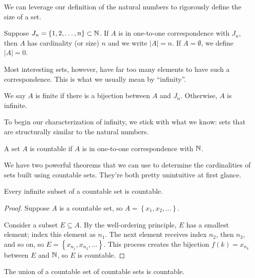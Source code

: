 \documentclass[../m131main.tex]{subfiles}
\begin{document}
We can leverage our definition of the natural numbers to rigorously define the size of a set.

\begin{definition}[Cardinality]
    Suppose $J_n = \left\{ 1, 2, \ldots, n \right\} \subset \mathbb{N}$.
    If $A$ is in one-to-one correspondence with $J_n$, then $A$ has cardinality (or size) $n$ and we write $|A| = n$.
    If $A = \emptyset$, we define $|A| = 0$.
\end{definition}

Most interesting sets, however, have far too many elements to have such a correspondence.
This is what we usually mean by ``infinity''.

\begin{definition}
    We say $A$ is finite if there is a bijection between $A$ and $J_n$.
    Otherwise, $A$ is infinite.
\end{definition}

To begin our characterization of infinity, we stick with what we know: sets that are structurally similar to the natural numbers.

\begin{definition}[Countable]
    A set $A$ is countable if $A$ is in one-to-one correspondence with $\mathbb{N}$.
\end{definition}

We have two powerful theorems that we can use to determine the cardinalities of sets built using countable sets.
They're both pretty unintuitive at first glance.

\begin{theorem}[]
    Every infinite subset of a countable set is countable.
\end{theorem}

\begin{proof}
    Suppose $A$ is a countable set, so $A = \left\{ x_1, x_2, \ldots \right\}$.

    Consider a subset $E \subseteq A$.
    By the well-ordering principle, $E$ has a smallest element; index this element as $n_1$.
    The next element receives index $n_2$, then $n_3$, and so on, so $E = \left\{ x_{n_1}, x_{n_2}, \ldots \right\}$.
    This process creates the bijection $f(k) = x_{n_k}$ between $E$ and $\mathbb{N}$, so $E$ is countable.
\end{proof}

\begin{theorem}
    The union of a countable set of countable sets is countable.
\end{theorem}
\end{document}
